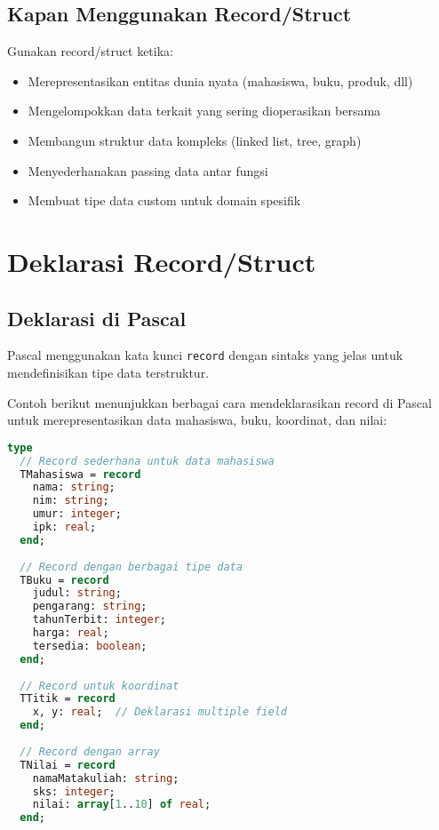 \documentclass[../main.tex]{subfiles}
\begin{document}
\subsection{Kapan Menggunakan Record/Struct}

Gunakan record/struct ketika:
\begin{itemize}
  \item Merepresentasikan entitas dunia nyata (mahasiswa, buku, produk, dll)
  \item Mengelompokkan data terkait yang sering dioperasikan bersama
  \item Membangun struktur data kompleks (linked list, tree, graph)
  \item Menyederhanakan passing data antar fungsi
  \item Membuat tipe data custom untuk domain spesifik
\end{itemize}

\section{Deklarasi Record/Struct}

\subsection{Deklarasi di Pascal}

Pascal menggunakan kata kunci \texttt{record} dengan sintaks yang jelas untuk mendefinisikan tipe data terstruktur.

Contoh berikut menunjukkan berbagai cara mendeklarasikan record di Pascal untuk merepresentasikan data mahasiswa, buku, koordinat, dan nilai:

\begin{lstlisting}[language=Pascal, caption={Deklarasi record di Pascal}]
type
  // Record sederhana untuk data mahasiswa
  TMahasiswa = record
    nama: string;
    nim: string;
    umur: integer;
    ipk: real;
  end;
  
  // Record dengan berbagai tipe data
  TBuku = record
    judul: string;
    pengarang: string;
    tahunTerbit: integer;
    harga: real;
    tersedia: boolean;
  end;
  
  // Record untuk koordinat
  TTitik = record
    x, y: real;  // Deklarasi multiple field
  end;
  
  // Record dengan array
  TNilai = record
    namaMatakuliah: string;
    sks: integer;
    nilai: array[1..10] of real;
  end;
\end{lstlisting}
\end{document}
